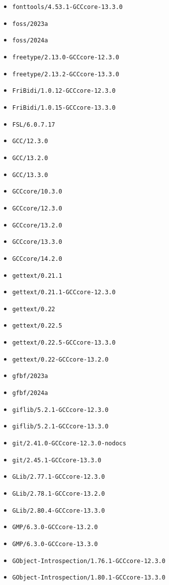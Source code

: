 \begin{multicols}{3}
\begin{itemize}
\item \verb|fonttools/4.53.1-GCCcore-13.3.0|
\item \verb|foss/2023a|
\item \verb|foss/2024a|
\item \verb|freetype/2.13.0-GCCcore-12.3.0|
\item \verb|freetype/2.13.2-GCCcore-13.3.0|
\item \verb|FriBidi/1.0.12-GCCcore-12.3.0|
\item \verb|FriBidi/1.0.15-GCCcore-13.3.0|
\item \verb|FSL/6.0.7.17|
\item \verb|GCC/12.3.0|
\item \verb|GCC/13.2.0|
\item \verb|GCC/13.3.0|
\item \verb|GCCcore/10.3.0|
\item \verb|GCCcore/12.3.0|
\item \verb|GCCcore/13.2.0|
\item \verb|GCCcore/13.3.0|
\item \verb|GCCcore/14.2.0|
\item \verb|gettext/0.21.1|
\item \verb|gettext/0.21.1-GCCcore-12.3.0|
\item \verb|gettext/0.22|
\item \verb|gettext/0.22.5|
\item \verb|gettext/0.22.5-GCCcore-13.3.0|
\item \verb|gettext/0.22-GCCcore-13.2.0|
\item \verb|gfbf/2023a|
\item \verb|gfbf/2024a|
\item \verb|giflib/5.2.1-GCCcore-12.3.0|
\item \verb|giflib/5.2.1-GCCcore-13.3.0|
\item \verb|git/2.41.0-GCCcore-12.3.0-nodocs|
\item \verb|git/2.45.1-GCCcore-13.3.0|
\item \verb|GLib/2.77.1-GCCcore-12.3.0|
\item \verb|GLib/2.78.1-GCCcore-13.2.0|
\item \verb|GLib/2.80.4-GCCcore-13.3.0|
\item \verb|GMP/6.3.0-GCCcore-13.2.0|
\item \verb|GMP/6.3.0-GCCcore-13.3.0|
\item \verb|GObject-Introspection/1.76.1-GCCcore-12.3.0|
\item \verb|GObject-Introspection/1.80.1-GCCcore-13.3.0|

\end{itemize}
\end{multicols}
